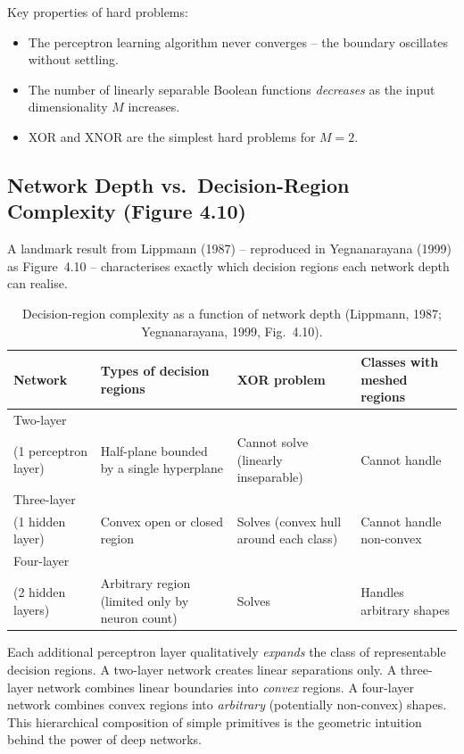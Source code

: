 \documentclass[12pt,a4paper]{article}
\begin{document}
Key properties of hard problems:
\begin{itemize}[noitemsep]
  \item The perceptron learning algorithm never converges -- the boundary
        oscillates without settling.
  \item The number of linearly separable Boolean functions
        \emph{decreases} as the input dimensionality $M$ increases.
  \item XOR and XNOR are the simplest hard problems for $M = 2$.
\end{itemize}

\subsection{Network Depth vs.\ Decision-Region Complexity (Figure 4.10)}
\label{subsec:depth-vs-region}

A landmark result from Lippmann (1987) -- reproduced in Yegnanarayana
(1999) as Figure~4.10 -- characterises exactly which decision regions
each network depth can realise.

\begin{table}[ht]
\centering
\caption{Decision-region complexity as a function of network depth
  (Lippmann, 1987; Yegnanarayana, 1999, Fig.~4.10).}
\label{tab:depth-regions}
\begin{tabular}{p{3.0cm} p{3.5cm} p{3.5cm} p{3.5cm}}
\toprule
\textbf{Network} & \textbf{Types of decision regions} &
\textbf{XOR problem} & \textbf{Classes with meshed regions} \\
\midrule
Two-layer\\(1 perceptron layer)
  & Half-plane bounded by a single hyperplane
  & Cannot solve (linearly inseparable)
  & Cannot handle \\
\midrule
Three-layer\\(1 hidden layer)
  & Convex open or closed region
  & Solves (convex hull around each class)
  & Cannot handle non-convex \\
\midrule
Four-layer\\(2 hidden layers)
  & Arbitrary region (limited only by neuron count)
  & Solves
  & Handles arbitrary shapes \\
\bottomrule
\end{tabular}
\end{table}

\begin{keyinsight}[title=Key Insight -- Depth Unlocks Richer Decision Regions]
Each additional perceptron layer qualitatively \emph{expands} the class
of representable decision regions.  A two-layer network creates linear
separations only.  A three-layer network combines linear boundaries into
\emph{convex} regions.  A four-layer network combines convex regions into
\emph{arbitrary} (potentially non-convex) shapes.  This hierarchical
composition of simple primitives is the geometric intuition behind the
power of deep networks.
\end{keyinsight}
\end{document}
